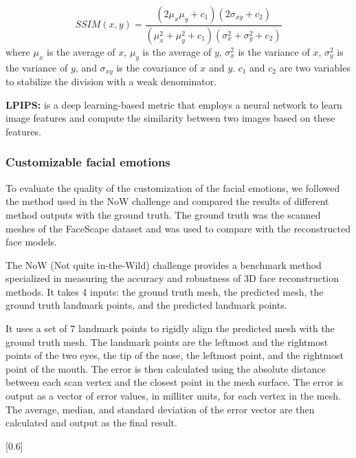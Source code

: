 \begin{equation}
    SSIM(x,y) = \frac{(2\mu_x\mu_y + c_1)(2\sigma_{xy}+c_2)}{(\mu_x^2+\mu_y^2+c_1)(\sigma_x^2+\sigma_y^2+c_2)}
\end{equation}
where $\mu_x$ is the average of $x$, $\mu_y$ is the average of $y$, $\sigma_x^2$ is the variance of $x$, $\sigma_y^2$ is the variance of $y$, and $\sigma_{xy}$ is the covariance of $x$ and $y$. $c_1$ and $c_2$ are two variables to stabilize the division with a weak denominator.


\textbf{LPIPS:}  \cite{zhangUnreasonableEffectivenessDeep2018} is a deep learning-based metric that employs a neural network to learn image features and compute the similarity between two images based on these features.

\subsubsection{Customizable facial emotions}
To evaluate the quality of the customization of the facial emotions, we followed the method used in the NoW challenge and compared the results of different method outputs with the ground truth. The ground truth was the scanned meshes of the FaceScape dataset and was used to compare with the reconstructed face models.

The NoW (Not quite in-the-Wild) challenge \cite{RingNet:CVPR:2019} provides a benchmark method specialized in measuring the accuracy and robustness of 3D face reconstruction methods. It takes 4 inputs: the ground truth mesh, the predicted mesh, the ground truth landmark points, and the predicted landmark points.

It uses a set of 7 landmark points to rigidly align the predicted mesh with the ground truth mesh. The landmark points are the leftmost and the rightmost points of the two eyes, the tip of the nose, the leftmost point, and the rightmost point of the mouth. The error is then calculated using the absolute distance between each scan vertex and the closest point in the mesh surface. The error is output as a vector of error values, in milliter units, for each vertex in the mesh. The average, median, and standard deviation of the error vector are then calculated and output as the final result.

[0.6]



